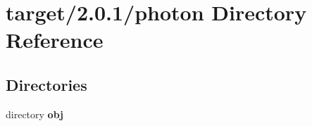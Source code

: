 \section{target/2.0.1/photon Directory Reference}
\label{dir_bbe372ba0c5e32aff1c855585f1e23ae}
\subsection*{Directories}
\begin{DoxyCompactItemize}
\item 
directory \textbf{ obj}
\end{DoxyCompactItemize}
